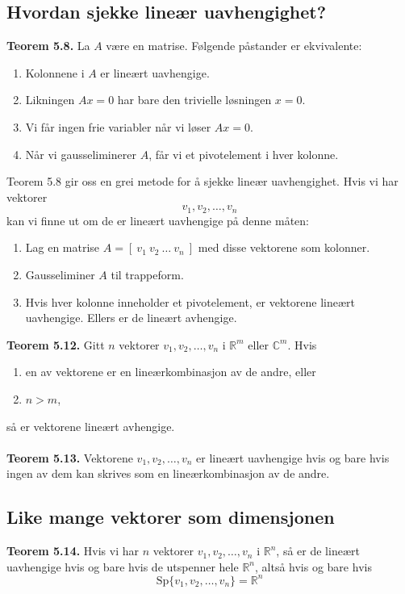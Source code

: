 \documentclass{article}
\begin{document}
\subsection{Hvordan sjekke lineær uavhengighet?}
\textbf{Teorem 5.8.} La $A$ være en matrise. Følgende påstander er ekvivalente:
\begin{enumerate}
    \item Kolonnene i $A$ er lineært uavhengige.
    \item Likningen $Ax = 0$ har bare den trivielle løsningen $x = 0$.
    \item Vi får ingen frie variabler når vi løser $Ax = 0$.
    \item Når vi gausseliminerer $A$, får vi et pivotelement i hver kolonne.
\end{enumerate}
Teorem 5.8 gir oss en grei metode for å sjekke lineær uavhengighet. Hvis vi har vektorer
\[ v_1, v_2, \dots, v_n \]
kan vi finne ut om de er lineært uavhengige på denne måten:
\begin{enumerate}
    \item Lag en matrise $A = [ \ v_1 \ v_2 \ \dots \ v_n \ ]$ med disse vektorene som kolonner.
    \item Gausseliminer $A$ til trappeform.
    \item Hvis hver kolonne inneholder et pivotelement, er vektorene lineært uavhengige. Ellers er de lineært avhengige.
\end{enumerate}
\textbf{Teorem 5.12.} Gitt $n$ vektorer $v_1, v_2, \dots, v_n$ i $\mathbb{R}^m$ eller $\mathbb{C}^m$. Hvis \begin{enumerate}
    \item en av vektorene er en lineærkombinasjon av de andre, eller
    \item $n > m$,
\end{enumerate}
så er vektorene lineært avhengige.
\\\\
\textbf{Teorem 5.13.} Vektorene $v_1, v_2, \dots, v_n$ er lineært uavhengige hvis og bare hvis ingen av dem kan skrives som en lineærkombinasjon av de andre.


\subsection{Like mange vektorer som dimensjonen}
\textbf{Teorem 5.14.} Hvis vi har $n$ vektorer $v_1, v_2, \dots, v_n$ i $\mathbb{R}^n$, så er de lineært uavhengige hvis og bare hvis de utspenner hele $\mathbb{R}^n$, altså hvis og bare hvis
\[\text{Sp}\{v_1, v_2, \dots, v_n \} = \mathbb{R}^n \]
\end{document}
